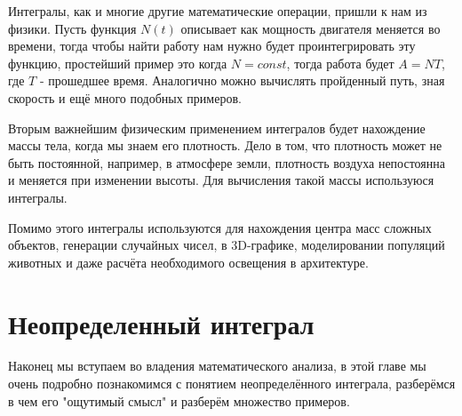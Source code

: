 \documentclass{book} %
\theoremstyle{definition}
\theoremstyle{remark}
\begin{document}
		Интегралы, как и многие другие математические операции, пришли к нам из физики. Пусть функция $N(t)$ описывает как мощность двигателя меняется во времени, тогда чтобы найти работу нам нужно будет проинтегрировать эту функцию, простейший пример это когда $ N = const$, тогда работа будет $A = NT$, где $T$ - прошедшее время.	Аналогично можно вычислять пройденный путь, зная скорость и ещё много подобных примеров.
		
		Вторым важнейшим физическим применением интегралов будет нахождение массы тела, когда мы знаем его плотность. Дело в том, что плотность может не быть постоянной, например, в атмосфере земли, плотность воздуха непостоянна и меняется при изменении высоты. Для вычисления такой массы используюся интегралы.
		
		Помимо этого интегралы используются для нахождения центра масс сложных объектов, генерации случайных чисел, в 3D-графике, моделировании популяций животных и даже расчёта необходимого освещения в архитектуре.
		
	\chapter{Неопределенный интеграл}
		Наконец мы вступаем во владения математического анализа, в этой главе мы очень подробно познакомимся с понятием неопределённого интеграла, разберёмся в чем его "ощутимый смысл" и разберём множество примеров.
\end{document}
